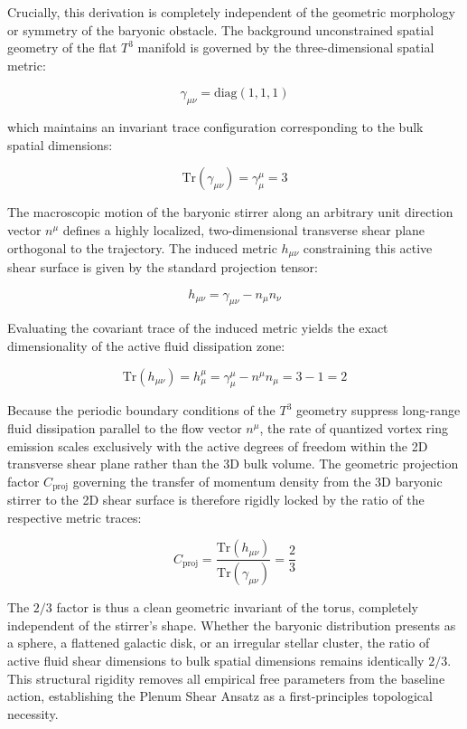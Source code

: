 \documentclass[aps,prd,10pt,onecolumn,superscriptaddress,nofootinbib]{revtex4-2}
\begin{document}
Crucially, this derivation is completely independent of the geometric morphology or symmetry of the baryonic obstacle. The background unconstrained spatial geometry of the flat $T^3$ manifold is governed by the three-dimensional spatial metric:

\begin{equation}
\gamma_{\mu\nu} = \text{diag}(1, 1, 1)
\end{equation}

which maintains an invariant trace configuration corresponding to the bulk spatial dimensions:

\begin{equation}
\text{Tr}(\gamma_{\mu\nu}) = \gamma^\mu_\mu = 3
\end{equation}

The macroscopic motion of the baryonic stirrer along an arbitrary unit direction vector $n^\mu$ defines a highly localized, two-dimensional transverse shear plane orthogonal to the trajectory. The induced metric $h_{\mu\nu}$ constraining this active shear surface is given by the standard projection tensor:

\begin{equation}
h_{\mu\nu} = \gamma_{\mu\nu} - n_{\mu}n_{\nu}
\end{equation}

Evaluating the covariant trace of the induced metric yields the exact dimensionality of the active fluid dissipation zone:

\begin{equation}
\text{Tr}(h_{\mu\nu}) = h^\mu_\mu = \gamma^\mu_\mu - n^\mu n_\mu = 3 - 1 = 2
\end{equation}

Because the periodic boundary conditions of the $T^3$ geometry suppress long-range fluid dissipation parallel to the flow vector $n^\mu$, the rate of quantized vortex ring emission scales exclusively with the active degrees of freedom within the 2D transverse shear plane rather than the 3D bulk volume. The geometric projection factor $C_{\text{proj}}$ governing the transfer of momentum density from the 3D baryonic stirrer to the 2D shear surface is therefore rigidly locked by the ratio of the respective metric traces:

\begin{equation}
C_{\text{proj}} = \frac{\text{Tr}(h_{\mu\nu})}{\text{Tr}(\gamma_{\mu\nu})} = \frac{2}{3}
\end{equation}

The $2/3$ factor is thus a clean geometric invariant of the torus, completely independent of the stirrer's shape. Whether the baryonic distribution presents as a sphere, a flattened galactic disk, or an irregular stellar cluster, the ratio of active fluid shear dimensions to bulk spatial dimensions remains identically $2/3$. This structural rigidity removes all empirical free parameters from the baseline action, establishing the Plenum Shear Ansatz as a first-principles topological necessity.
\end{document}
